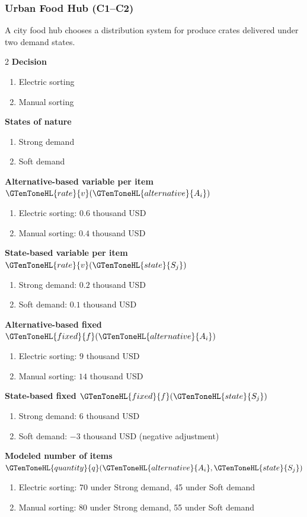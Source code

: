 	\subsubsection{Urban Food Hub (C1--C2)}
	\label{sec:problem34-urban-food-hub-c1-c2}
	A city food hub chooses a distribution system for produce crates delivered under two demand states.
	\begin{multicols}{2}
	\textbf{Decision }
	\begin{enumerate}[label=\arabic*.]
\item Electric sorting
\item Manual sorting
	\end{enumerate}
	\textbf{States of nature}
	\begin{enumerate}[label=\arabic*.]
\item Strong demand
\item Soft demand
	\end{enumerate}
	\columnbreak
	\textbf{Alternative-based variable  per item $\GTenToneHL{rate}{v}(\GTenToneHL{alternative}{A_i})$}
\begin{enumerate}[label=\arabic*.]
\item Electric sorting: $0.6$ thousand USD
\item Manual sorting: $0.4$ thousand USD\end{enumerate}
\textbf{State-based variable  per item $\GTenToneHL{rate}{v}(\GTenToneHL{state}{S_j})$}
\begin{enumerate}[label=\arabic*.]
\item Strong demand: $0.2$ thousand USD
\item Soft demand: $0.1$ thousand USD\end{enumerate}
\textbf{Alternative-based fixed  $\GTenToneHL{fixed}{f}(\GTenToneHL{alternative}{A_i})$}
\begin{enumerate}[label=\arabic*.]
\item Electric sorting: $9$ thousand USD
\item Manual sorting: $14$ thousand USD\end{enumerate}
\textbf{State-based fixed  $\GTenToneHL{fixed}{f}(\GTenToneHL{state}{S_j})$}
\begin{enumerate}[label=\arabic*.]
\item Strong demand: $6$ thousand USD
\item Soft demand: $-3$ thousand USD (negative adjustment)\end{enumerate}
\textbf{Modeled number of items $\GTenToneHL{quantity}{q}(\GTenToneHL{alternative}{A_i},\GTenToneHL{state}{S_j})$}
\begin{enumerate}[label=\arabic*.]
\item Electric sorting: 70 under Strong demand, 45 under Soft demand
\item Manual sorting: 80 under Strong demand, 55 under Soft demand
\end{enumerate}
	\end{multicols}


